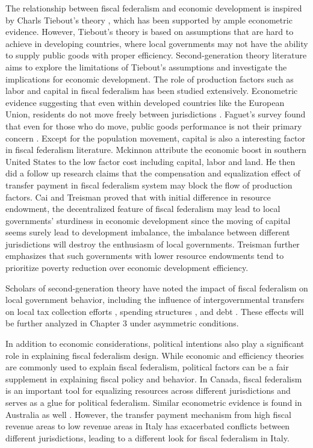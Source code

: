 The relationship between fiscal federalism and economic development is inspired by Charls Tiebout's theory \cite{tiebout1956pure}, which has been supported by ample econometric evidence. However, Tiebout's theory is based on assumptions that are hard to achieve in developing countries, where local governments may not have the ability to supply public goods with proper efficiency. Second-generation theory literature aims to explore the limitations of Tiebout's assumptions and investigate the implications for economic development. The role of production factors such as labor and capital in fiscal federalism has been studied extensively. Econometric evidence suggesting that even within developed countries like the European Union, residents do not move freely between jurisdictions \cite{oates2004essay}. Faguet's survey found that even for those who do move, public goods performance is not their primary concern \cite{faguet2004does}. Except for the population movement, capital is also a interesting factor in fiscal federalism literature. Mckinnon \cite{mckinnon1993order} attribute the economic boost in southern United States to the low factor cost including capital, labor and land. He then did a follow up research claims that the compensation and equalization effect of transfer payment in fiscal federalism system may block the flow of production factors. Cai and Treisman \cite{cai2005does} proved that with initial difference in resource endowment, the decentralized feature of fiscal federalism may lead to local governments' sturdiness in economic development since the moving of capital seems surely lead to development imbalance, the imbalance between different jurisdictions will destroy the enthusiasm of local governments. Treisman \cite{treisman2002decentralization} further emphasizes that such governments with lower resource endowments tend to prioritize poverty reduction over economic development efficiency.

Scholars of second-generation theory have noted the impact of fiscal federalism on local government behavior, including the influence of intergovernmental transfers on local tax collection efforts \cite{mogues2012external}, spending structures \cite{hines1995anomalies}, and debt \cite{qian1998federalism}. These effects will be further analyzed in Chapter 3 under asymmetric conditions.

In addition to economic considerations, political intentions also play a significant role in explaining fiscal federalism design. While economic and efficiency theories are commonly used to explain fiscal federalism, political factors can be a fair supplement in explaining fiscal policy and behavior. In Canada, fiscal federalism is an important tool for equalizing resources across different jurisdictions and serves as a glue for political federalism. Similar econometric evidence is found in Australia as well \cite{oates2005toward}. However, the transfer payment mechanism from high fiscal revenue areas to low revenue areas in Italy has exacerbated conflicts between different jurisdictions, leading to a different look for fiscal federalism in Italy.

